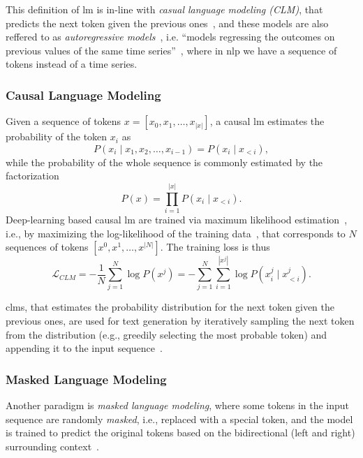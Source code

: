 This definition of \ac{lm} is in-line with \emph{casual language modeling (CLM)}, that predicts the next token given the previous ones~\cite{jain-etal-2023-cl-for-causal-lm,jm3}, and these models are also reffered to as \emph{autoregressive models}~\cite{jm3}, i.e. ``models regressing the outcomes on previous values of the same time series''~\cite{regis2022_autoregressive}, where in \ac{nlp} we have a sequence of tokens instead of a time series.

\subsubsection{Causal Language Modeling}

Given a sequence of tokens $x = [x_0, x_1, \ldots, x_|x|]$, a causal \ac{lm} estimates the probability of the token $x_i$ as
\begin{equation}
    P(x_i \mid x_1, x_2, \ldots, x_{i-1}) = P(x_i \mid x_{<i}),
\end{equation}
while the probability of the whole sequence is commonly estimated by the factorization~\cite{jain-etal-2023-cl-for-causal-lm,jm3}
\begin{equation}
    P(x) = \prod_{i=1}^{|x|} P(x_i \mid x_{<i}).
\end{equation}
Deep-learning based causal \ac{lm} are trained via maximum likelihood estimation~\cite{jain-etal-2023-cl-for-causal-lm}, i.e., by maximizing the log-likelihood of the training data~\cite{MLE_tutorial}, that corresponds to $N$ sequences of tokens $[x^0, x^1, \ldots, x^|N|]$. The training loss is thus
\begin{equation}
    \mathcal{L}_{CLM} = - \frac{1}{N} \sum_{j=1}^{N} \log P(x^j) = - \sum_{j=1}^{N} \sum_{i=1}^{|x^j|} \log P(x_i^j \mid x_{<i}^j).
\end{equation}

\Aclp{clm}, that estimates the probability distribution for the next token given the previous ones, are used for text generation by iteratively sampling the next token from the distribution (e.g., greedily selecting the most probable token) and appending it to the input sequence~\cite{jm3}. 

\subsubsection{Masked Language Modeling}

Another paradigm is \emph{masked language modeling}, where some tokens in the input sequence are randomly \emph{masked}, i.e., replaced with a special token, and the model is trained to predict the original tokens based on the bidirectional (left and right) surrounding context~\cite{devlin-etal-2019-bert}.

